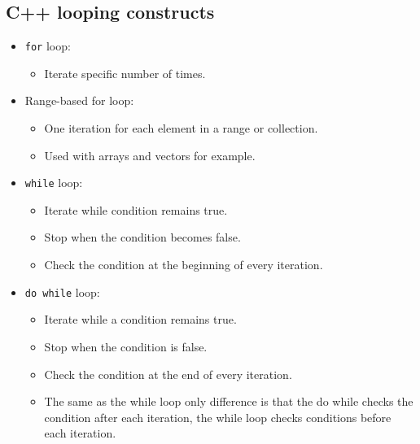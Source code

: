 \subsection{C++ looping constructs}
\begin{itemize}
    \item \texttt{for} loop:
        \begin{itemize}
            \item Iterate specific number of times.
        \end{itemize}
    
    \item Range-based for loop:
        \begin{itemize}
            \item One iteration for each element in a range or collection.
            \item Used with arrays and vectors for example.
        \end{itemize}
    
    \item \texttt{while} loop:
        \begin{itemize}
            \item Iterate while condition remains true.
            \item Stop when the condition becomes false.
            \item Check the condition at the beginning of every iteration.
        \end{itemize}
    
    \item \texttt{do while} loop:
        \begin{itemize}
            \item Iterate while a condition remains true.
            \item Stop when the condition is false.
            \item Check the condition at the end of every iteration.
            \item The same as the while loop only difference is that the do while checks the condition after each iteration, the while loop checks conditions before each iteration.
        \end{itemize}
\end{itemize}


